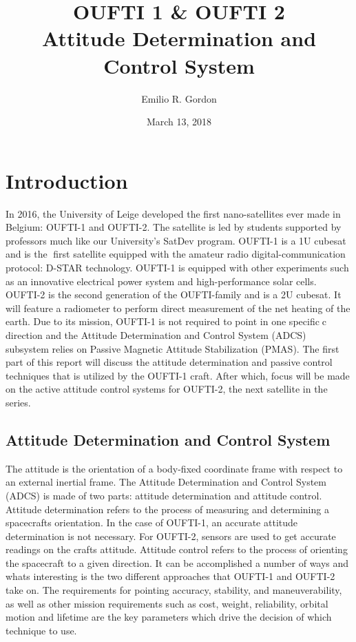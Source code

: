 \documentclass[12pt]{article}
\title{OUFTI 1 \& OUFTI 2 \\
  \large Attitude Determination and Control System}
\author{Emilio R. Gordon}
\date{March 13, 2018}
\begin{document}
\maketitle

\tableofcontents
\newpage
\section{Introduction }
In 2016, the University of Leige developed the first nano-satellites ever made in Belgium: OUFTI-1 and OUFTI-2. The satellite is led by students supported by professors much like our University's SatDev program. OUFTI-1 is a 1U cubesat and is the first satellite equipped with the amateur radio digital-communication protocol: D-STAR technology. OUFTI-1 is equipped with other experiments such as an innovative electrical power system and high-performance solar cells.  OUFTI-2 is the second generation of the OUFTI-family and is a 2U cubesat. It will feature a radiometer to perform direct measurement of the net heating of the earth. 
\newline \newline
Due to its mission, OUFTI-1 is not required to point in one specificc direction and the Attitude Determination and Control System (ADCS) subsystem relies on Passive Magnetic Attitude Stabilization (PMAS). The first part of this report will discuss the attitude determination and passive control techniques that is utilized by the OUFTI-1 craft. After which, focus will be made on the active attitude control systems for OUFTI-2, the next satellite in the series. 
\subsection{Attitude Determination and Control System}
The attitude is the orientation of a body-fixed coordinate frame with respect to an external inertial frame. The Attitude Determination and Control System (ADCS) is made of two parts: attitude determination and attitude control.
\newline \newline
Attitude determination refers to the process of measuring and determining a spacecrafts orientation. In the case of OUFTI-1, an accurate attitude determination is not necessary. For OUFTI-2, sensors are used to get accurate readings on the crafts attitude. 
\newline \newline
Attitude control refers to the process of orienting the spacecraft to a given direction. It can be accomplished a number of ways and whats interesting is the two different approaches that OUFTI-1 and OUFTI-2 take on. The requirements for pointing accuracy, stability, and maneuverability, as well as other mission requirements such as cost, weight, reliability, orbital motion and lifetime are the key parameters which drive the decision of which technique to use. 
\end{document}
